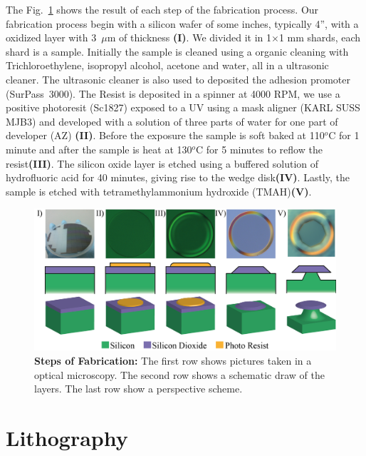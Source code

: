 The Fig.~\ref{fig:fab_step} shows the result of each step of the fabrication process. Our fabrication process begin with a silicon wafer of some inches, typically 4'', with a oxidized layer with 3~$\mu$m of thickness \textbf{(I)}. We divided it in 1$\times$1 mm shards, each shard is a sample. Initially the sample is cleaned using a organic cleaning with Trichloroethylene, isopropyl alcohol, acetone and water, all in a ultrasonic cleaner. The ultrasonic cleaner is also used to deposited the adhesion promoter (SurPass\regmark~3000). The Resist is deposited in a spinner at 4000 RPM, we use a positive photoresit (Sc1827) exposed to a UV using a mask aligner (KARL SUSS MJB3) and developed with a solution of three parts of water for one part of developer (AZ) \textbf{(II)}. Before the exposure the sample is soft baked at 110$^o$C for 1 minute and after the sample is heat at 130$^o$C for 5 minutes to reflow the resist\textbf{(III)}. The silicon oxide layer is etched using a buffered solution of hydrofluoric acid for 40 minutes, giving rise to the wedge disk\textbf{(IV)}. Lastly, the sample is etched with tetramethylammonium hydroxide (TMAH)\textbf{(V)}. 

\begin{figure}[!t]
    \centering
    \includegraphics[width = 16cm]{figuras/Dissertation_fabrication_steps.jpg}
    \caption{\textbf{Steps of Fabrication:} The first row shows pictures taken in a optical microscopy. The second row shows a schematic draw of the layers. The last row show a perspective scheme.}
    \label{fig:fab_step}
\end{figure}

\section{Lithography}


